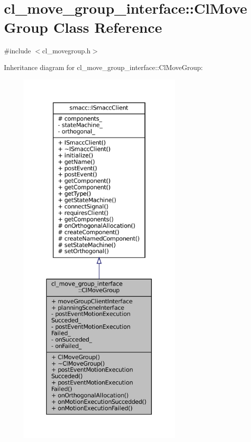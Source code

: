 \hypertarget{classcl__move__group__interface_1_1ClMoveGroup}{}\section{cl\+\_\+move\+\_\+group\+\_\+interface\+:\+:Cl\+Move\+Group Class Reference}
\label{classcl__move__group__interface_1_1ClMoveGroup}


{\ttfamily \#include $<$cl\+\_\+movegroup.\+h$>$}



Inheritance diagram for cl\+\_\+move\+\_\+group\+\_\+interface\+:\+:Cl\+Move\+Group\+:
\nopagebreak
\begin{figure}[H]
\begin{center}
\leavevmode
\includegraphics[height=550pt]{classcl__move__group__interface_1_1ClMoveGroup__inherit__graph}
\end{center}
\end{figure}


